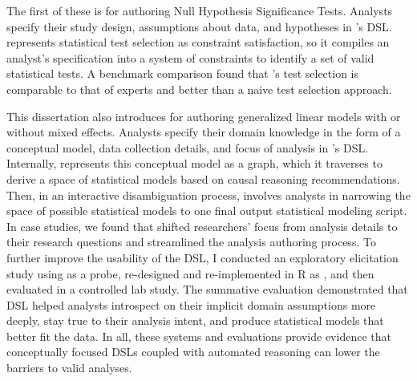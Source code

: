 The first of these is \tea for authoring Null Hypothesis Significance
Tests. Analysts specify their study design, assumptions about data, and
hypotheses in \tea's DSL. \tea represents statistical test selection as
constraint satisfaction, so it compiles an analyst's specification into a system
of constraints to identify a set of valid statistical tests. A benchmark
comparison found that \tea's test selection is comparable to that of experts and
better than a naive test selection approach. 

This dissertation also introduces \tisane for authoring generalized linear
models with or without mixed effects. Analysts specify their domain knowledge in
the form of a conceptual model, data collection details, and focus of analysis
in \tisane's DSL. Internally, \tisane represents this conceptual model as a
graph, which it traverses to derive a space of statistical models based on
causal reasoning recommendations. Then, in an interactive disambiguation
process, \tisane involves analysts in narrowing the space of possible
statistical models to one final output statistical modeling script. In case
studies, we found that \tisane shifted researchers' focus from analysis details
to their research questions and streamlined the analysis authoring process. To
further improve the usability of the \tisane DSL, I conducted an exploratory
elicitation study using \tisane as a probe, re-designed and re-implemented
\tisane in R as \rTisane, and then evaluated \rTisane in a controlled lab study.
The summative evaluation demonstrated that \rTisanes DSL helped analysts
introspect on their implicit domain assumptions more deeply, stay true to their
analysis intent, and produce statistical models that better fit the data. In
all, these systems and evaluations provide evidence that conceptually focused
DSLs coupled with automated reasoning can lower the barriers to valid analyses.



